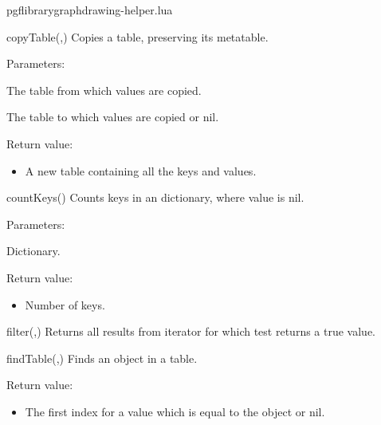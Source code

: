 
\begin{filedescription}{pgflibrarygraphdrawing-helper.lua}


\begin{luacommand}{{copyTable}(,)}
Copies a table, preserving its metatable.

Parameters:
\begin{parameterdescription}
	\item[\meta{table}] The table from which values are copied.\item[\meta{result}] The table to which values are copied or nil.
\end{parameterdescription}


Return value:
\begin{itemize} \item[] A new table containing all the keys and values. \end{itemize}


\end{luacommand}\begin{luacommand}{{countKeys}()}
Counts keys in an dictionary, where value is nil.

Parameters:
\begin{parameterdescription}
	\item[\meta{table}] Dictionary.
\end{parameterdescription}


Return value:
\begin{itemize} \item[] Number of keys. \end{itemize}


\end{luacommand}\begin{luacommand}{{filter}(,)}
Returns all results from iterator for which test returns a true value.



\end{luacommand}\begin{luacommand}{{findTable}(,)}
Finds an object in a table.


Return value:
\begin{itemize} \item[] The first index for a value which is equal to the object or nil. \end{itemize}



\end{luacommand}
\end{filedescription}
